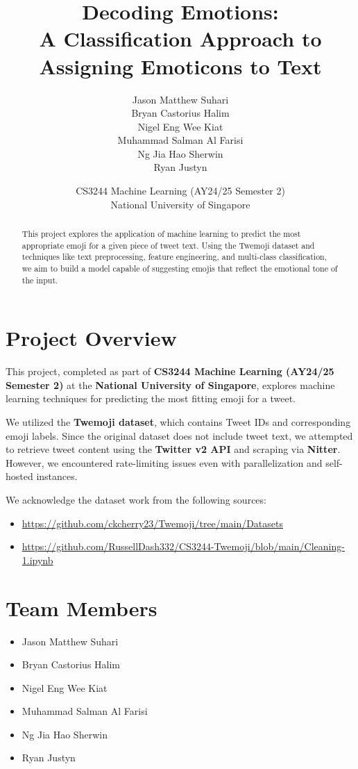 \documentclass[11pt]{article}
\title{\textbf{Decoding Emotions:\\A Classification Approach to Assigning Emoticons to Text}}
\author{
  Jason Matthew Suhari \\
  Bryan Castorius Halim \\
  Nigel Eng Wee Kiat \\
  Muhammad Salman Al Farisi \\
  Ng Jia Hao Sherwin \\
  Ryan Justyn
}
\date{CS3244 Machine Learning (AY24/25 Semester 2)\\
National University of Singapore}
\begin{document}
\maketitle

\begin{abstract}
This project explores the application of machine learning to predict the most appropriate emoji for a given piece of tweet text. Using the Twemoji dataset and techniques like text preprocessing, feature engineering, and multi-class classification, we aim to build a model capable of suggesting emojis that reflect the emotional tone of the input.
\end{abstract}

\section{Project Overview}
This project, completed as part of \textbf{CS3244 Machine Learning (AY24/25 Semester 2)} at the \textbf{National University of Singapore}, explores machine learning techniques for predicting the most fitting emoji for a tweet.

We utilized the \textbf{Twemoji dataset}, which contains Tweet IDs and corresponding emoji labels. Since the original dataset does not include tweet text, we attempted to retrieve tweet content using the \textbf{Twitter v2 API} and scraping via \textbf{Nitter}. However, we encountered rate-limiting issues even with parallelization and self-hosted instances.

We acknowledge the dataset work from the following sources:
\begin{itemize}[leftmargin=1.5em]
  \item \url{https://github.com/ckcherry23/Twemoji/tree/main/Datasets}
  \item \url{https://github.com/RussellDash332/CS3244-Twemoji/blob/main/Cleaning-1.ipynb}
\end{itemize}

\section{Team Members}
\begin{itemize}[leftmargin=1.5em]
  \item Jason Matthew Suhari
  \item Bryan Castorius Halim
  \item Nigel Eng Wee Kiat
  \item Muhammad Salman Al Farisi
  \item Ng Jia Hao Sherwin
  \item Ryan Justyn
\end{itemize}
\end{document}
